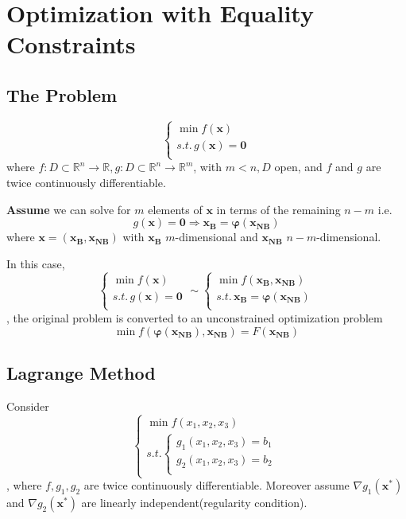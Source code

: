 \section{Optimization with Equality Constraints}

\subsection{The Problem}

\[
    \left\{\begin{array}{l}
        \min f(\mathbf{x})                 \\
        s.t. \, g(\mathbf{x}) = \mathbf{0} \\
    \end{array}\right.
\] where $f: D \subset \mathbb{R}^{n} \to \mathbb{R}, g: D \subset \mathbb{R}^{n} \to \mathbb{R}^{m}$, with $m < n, D$ open, and $f$ and $g$ are twice continuously differentiable.

\textbf{Assume} we can solve for $m$ elements of $\mathbf{x}$ in terms of the remaining $n-m$ i.e. \[
    g(\mathbf{x}) = \mathbf{0} \Longrightarrow \mathbf{x_B} = \boldsymbol{\varphi(x_{NB})}
\]
where $\mathbf{x = (x_B, x_{NB})}$ with $\mathbf{x_B}$ $m$-dimensional and $\mathbf{x_{NB}}$ $n-m$-dimensional.

In this case, \[
    \left\{\begin{array}{l}
        \min f(\mathbf{x})                 \\
        s.t. \, g(\mathbf{x}) = \mathbf{0} \\
    \end{array}\right. \sim \left\{\begin{array}{l}
        \min f(\mathbf{x_B}, \mathbf{x_{NB}})               \\
        s.t. \, \mathbf{x_B = \boldsymbol{\varphi}(x_{NB})} \\
    \end{array}\right.
\]
, the original problem is converted to an unconstrained optimization problem \[
    \min f(\boldsymbol{\varphi (\mathbf{x_{NB}}), \mathbf{x_{NB}}}) = F(\mathbf{x_{NB}})
\]


\subsection{Lagrange Method}
Consider
\[
    \left\{\begin{array}{l}
        \min f(x_1, x_2, x_3) \\
        s.t. \left\{\begin{array}{l}
                        g_1(x_1, x_2, x_3) = b_1 \\
                        g_2(x_1, x_2, x_3) = b_2 \\
                    \end{array}\right.
    \end{array}\right.
\]
, where $f, g_1, g_2$ are twice continuously differentiable. Moreover assume $\nabla g_1(\mathbf{x ^{*}})$ and $\nabla g_2(\mathbf{x ^{*}})$ are linearly independent(regularity condition).


